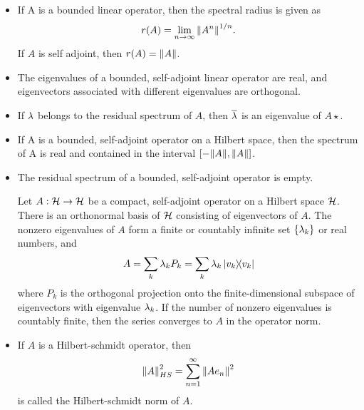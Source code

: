 \begin{itemize}
    \item If A is a bounded linear operator, then the spectral radius is given as 
    \[r(A) = \lim_{n \to \infty} \norm{A^n}^{1/n}.\]
    If $A$ is self adjoint, then $r(A) = \norm{A}$.

    \item The eigenvalues of a bounded, self-adjoint linear operator are real, and eigenvectors associated with different eigenvalues are orthogonal. 

    \item If $\mathrm{\lambda}$ belongs to the residual spectrum of $A$, then $\overline{\mathrm{\lambda}}$ is an eigenvalue of $A\star$. 

    \item If A is a bounded, self-adjoint operator on a Hilbert space, then the spectrum of A is real and contained in the interval $[-\norm{A}, \norm{A}]$.
    
    \item The residual spectrum of a bounded, self-adjoint operator is empty.

    {
    Let $A : \mathcal{H} \to \mathcal{H}$ be a compact, self-adjoint operator on a Hilbert space $\mathcal{H}$. There is an orthonormal basis of $\mathcal{H}$ consisting of eigenvectors of $A$. The nonzero eigenvalues of $A$ form a finite or countably infinite set $\{\mathrm{\lambda}_k\}$ or real numbers, and 
    \[A = \sum_k \mathrm{\lambda}_k P_k =    \sum_k \mathrm{\lambda}_k \ketbra{v_k}{v_k} \]
    where $P_k$ is the orthogonal projection onto the finite-dimensional subspace of eigenvectors with eigenvalue $\mathrm{\lambda}_k$. If the number of nonzero eigenvalues is countably finite, then the series converges to $A$ in the operator norm. 
    }


    \item If $A$ is a Hilbert-schmidt operator, then
    \[\norm{A}_{HS}^2 = \sum_{n = 1}^\infty \norm{Ae_n}^2\]
    is called the Hilbert-schmidt norm of $A$.


\end{itemize}
